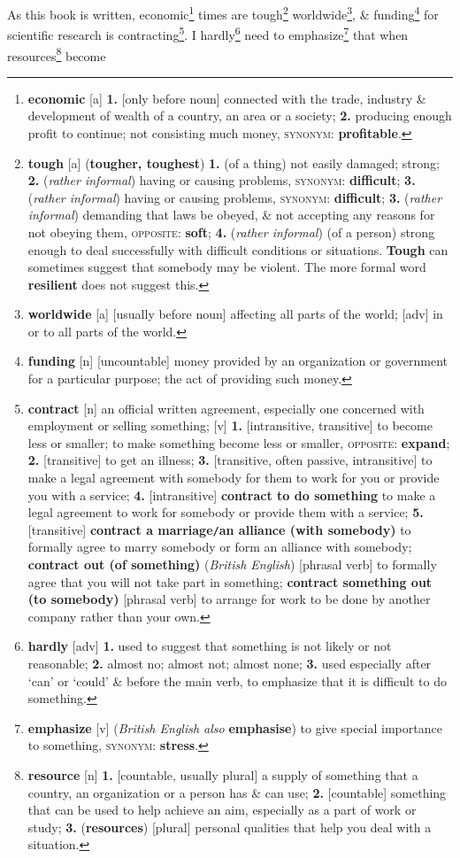 \documentclass[oneside]{book}
\numberwithin{equation}{section}
\begin{document}
As this book is written, economic\footnote{\textbf{economic} [a] \textbf{1.} [only before noun] connected with the trade, industry \& development of wealth of a country, an area or a society; \textbf{2.} producing enough profit to continue; not consisting much money, \textsc{synonym}: \textbf{profitable}.} times are tough\footnote{\textbf{tough} [a] (\textbf{tougher, toughest}) \textbf{1.} (of a thing) not easily damaged; strong; \textbf{2.} (\textit{rather informal}) having or causing problems, \textsc{synonym}: \textbf{difficult}; \textbf{3.} (\textit{rather informal}) having or causing problems, \textsc{synonym}: \textbf{difficult}; \textbf{3.} (\textit{rather informal}) demanding that laws be obeyed, \& not accepting any reasons for not obeying them, \textsc{opposite}: \textbf{soft}; \textbf{4.} (\textit{rather informal}) (of a person) strong enough to deal successfully with difficult conditions or situations. \textbf{Tough} can sometimes suggest that somebody may be violent. The more formal word \textbf{resilient} does not suggest this.} worldwide\footnote{\textbf{worldwide} [a] [usually before noun] affecting all parts of the world; [adv] in or to all parts of the world.}, \& funding\footnote{\textbf{funding} [n] [uncountable] money provided by an organization or government for a particular purpose; the act of providing such money.} for scientific research is contracting\footnote{\textbf{contract} [n] an official written agreement, especially one concerned with employment or selling something; [v] \textbf{1.} [intransitive, transitive] to become less or smaller; to make something become less or smaller, \textsc{opposite}: \textbf{expand}; \textbf{2.} [transitive] to get an illness; \textbf{3.} [transitive, often passive, intransitive] to make a legal agreement with somebody for them to work for you or provide you with a service; \textbf{4.} [intransitive] \textbf{contract to do something} to make a legal agreement to work for somebody or provide them with a service; \textbf{5.} [transitive] \textbf{contract a marriage\texttt{/}an alliance (with somebody)} to formally agree to marry somebody or form an alliance with somebody; \textbf{contract out (of something)} (\textit{British English}) [phrasal verb] to formally agree that you will not take part in something; \textbf{contract something out (to somebody)} [phrasal verb] to arrange for work to be done by another company rather than your own.}. I hardly\footnote{\textbf{hardly} [adv] \textbf{1.} used to suggest that something is not likely or not reasonable; \textbf{2.} almost no; almost not; almost none; \textbf{3.} used especially after `can' or `could' \& before the main verb, to emphasize that it is difficult to do something.} need to emphasize\footnote{\textbf{emphasize} [v] (\textit{British English also} \textbf{emphasise}) to give special importance to something, \textsc{synonym}: \textbf{stress}.} that when resources\footnote{\textbf{resource} [n] \textbf{1.} [countable, usually plural] a supply of something that a country, an organization or a person has \& can use; \textbf{2.} [countable] something that can be used to help achieve an aim, especially as a part of work or study; \textbf{3.} (\textbf{resources}) [plural] personal qualities that help you deal with a situation.} become 
\end{document}
